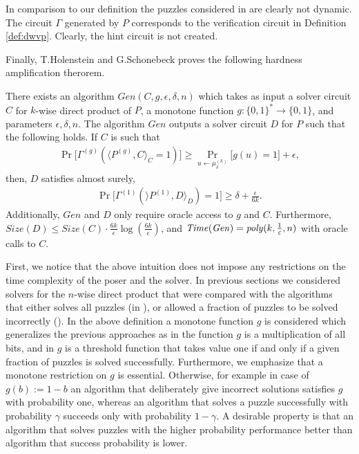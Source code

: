 In comparison to our definition the puzzles considered in \cite{DBLP:journals/corr/abs-1002-3534} are clearly not dynamic.
The circuit $\Gamma$ generated by $P$ corresponds to the verification circuit in Definition \ref{def:dwvp}.
Clearly, the hint circuit is not created.

Finally, T.Holenstein and G.Schonebeck proves the following hardness amplification therorem.
\begin{theorem}
There exists an algorithm $\mathit{Gen}(C,g,\epsilon, \delta, n)$ which takes as input a solver circuit $C$ for $k$-wise
direct product of $P$, a monotone function $g: \{0,1\}^{*} \rightarrow \{0,1\}$, and parameters $\epsilon,\delta,n$.
The algorithm $\mathit{Gen}$ outputs a solver circuit $D$ for $P$ such that the following holds.
If $C$ is such that
\begin{align*}
\Pr\Big[\Gamma^{(g)}(\Big\langle P^{(g)}, C \Big\rangle_C = 1) \Big] \geq \Pr_{u \leftarrow \mu_{\delta}^{(k)}} \Big[ g(u) = 1 \Big] + \epsilon,
\end{align*}
then, $D$ satisfies almost surely,
\begin{align*}
  \Pr\Big[ \Gamma^{(1)}(\rangle P^{(1)}, D\rangle_{D}) = 1\Big] \geq \delta + \frac{\epsilon}{6k}.
\end{align*}
Additionally, $\mathit{Gen}$ and $D$ only require oracle access to $g$ and $C$.
Furthermore, $\mathit{Size}(D) \leq \mathit{Size}(C) \cdot \frac{6k}{\epsilon} \log(\frac{6k}{\epsilon})$,
and $\operatorname{\mathit{Time}} (\mathit{Gen}) = \operatorname{\mathit{poly}}(k, \frac{1}{\varepsilon}, n)$ with oracle calls to $C$.
\end{theorem}

First, we notice that the above intuition does not impose any restrictions on the time complexity of the poser and the solver.
In previous sections we considered solvers for the $n$-wise direct product that were compared with the algorithms that either
solves all puzzles (in \cite{canetti2004hardness}), or allowed a fraction of puzzles to be solved incorrectly (\cite{Dodis:2009:SAI:1530441.1530450}).
In the above definition a monotone function $g$ is considered which generalizes the previous approaches as in \cite{canetti2004hardness}
the function $g$ is a multiplication of all bits, and in \cite{Dodis:2009:SAI:1530441.1530450} $g$ is a threshold function that takes value
one if and only if a given fraction of puzzles is solved successfully.
Furthermore, we emphasize that a monotone restriction on $g$ is essential. Otherwise, for example in case of $g(b) := 1 - b$ an algorithm that
deliberately give incorrect solutions satisfies $g$ with probability one, whereas an algorithm that solves a puzzle successfully with probability
$\gamma$ succeeds only with probability $1 - \gamma$.
A desirable property is that an algorithm that solves puzzles with the higher probability performance better than algorithm that success probability is lower.

